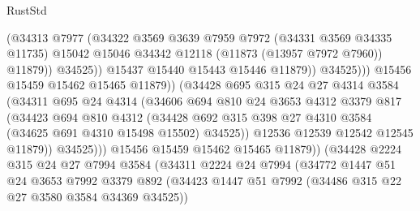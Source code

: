 \begin{lexlean}{RustStd}
\begin{coremodule}
                                  (@34313
                                    @7977
                                    (@34322
                                      @3569
                                      @3639
                                      @7959
                                      @7972
                                      (@34331 @3569 @34335 @11735)
                                      @15042
                                      @15046
                                      @34342
                                      @12118
                                      (@11873 (@13957 @7972 @7960))
                                      @11879))
                                  @34525))
                              @15437
                              @15440
                              @15443
                              @15446
                              @11879))
                          @34525)))
                    @15456
                    @15459
                    @15462
                    @15465
                    @11879))
                (@34428
                  @695
                  @315
                  @24
                  @27
                  @4314
                  @3584
                  (@34311
                    @695
                    @24
                    @4314
                    (@34606
                      @694
                      @810
                      @24
                      @3653
                      @4312
                      @3379
                      @817
                      (@34423
                        @694
                        @810
                        @4312
                        (@34428
                          @692
                          @315
                          @398
                          @27
                          @4310
                          @3584
                          (@34625 @691 @4310 @15498 @15502)
                          @34525))
                      @12536
                      @12539
                      @12542
                      @12545
                      @11879))
                  @34525)))
            @15456
            @15459
            @15462
            @15465
            @11879))
        (@34428
          @2224
          @315
          @24
          @27
          @7994
          @3584
          (@34311
            @2224
            @24
            @7994
            (@34772
              @1447
              @51
              @24
              @3653
              @7992
              @3379
              @892
              (@34423 @1447 @51 @7992 (@34486 @315 @22 @27 @3580 @3584 @34369 @34525))

\end{coremodule}
\end{lexlean}
